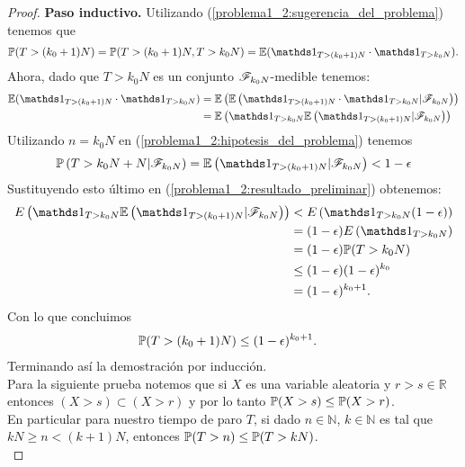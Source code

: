 \begin{proof}
	\textbf{Paso inductivo.} 
	Utilizando (\ref{problema1_2:sugerencia_del_problema}) tenemos que
		\begin{align}
			\mw(T>(k_0+1)N) = \mw(T>(k_0+1)N, T>k_0N) = \E(\indic_{T>(k_0+1)N} \cdot \indic_{T>k_0N}).
		\end{align}
	Ahora, dado que $T>k_0N$ es un conjunto $\mathscr{F}_{k_0N}$-medible tenemos:
	\begin{align} 
		\E(\indic_{T>(k_0+1)N} \cdot \indic_{T>k_0N}) 	&=		\E\left(\E\left(\indic_{T>(k_0+1)N} \cdot \indic_{T>k_0N} | \F_{k_0N}\right)\right) \\ 
														&=		\E\left(\indic_{T>k_0N} \E\left(\indic_{T>(k_0+1)N}|\F_{k_0N}\right)\right) \label{problema1_2:resultado_preliminar}
	\end{align}
	Utilizando  $n=k_0N$ en (\ref{problema1_2:hipotesis_del_problema}) tenemos
	\begin{align}
		\mw\left(T>k_0N+N|\F_{k_0N}\right) = \E\left(\indic_{T>(k_0+1)N}|\F_{k_0N}\right) < 1-\epsilon
	\end{align}
	Sustituyendo esto último en (\ref{problema1_2:resultado_preliminar}) obtenemos:
		\begin{align}
				 E\left(\indic_{T>k_0N} \E\left(\indic_{T>(k_0+1)N}|\F_{k_0N}\right)\right) 	&< 		E\left(\indic_{T>k_0N} (1-\epsilon)\right) \\
																								&=	 	(1-\epsilon) E\left(\indic_{T>k_0N} \right) \\
																								&=		(1-\epsilon) \mw(T>k_0N) \\
																								&\leq   (1-\epsilon)(1-\epsilon)^{k_0} \\
																								&= (1-\epsilon)^{k_0 + 1}.
		\end{align}
	Con lo que concluimos
		\begin{align}
			\mathbb{P}(T>(k_0+1)N) &\leq (1-\epsilon)^{k_0 + 1}.		
		\end{align}
	Terminando así la demostración por inducción.\\
	
	
	Para la siguiente prueba notemos que si $X$ es una variable aleatoria y $r > s \in \mathbb{R}$ entonces
	$(X > s) \subset (X > r)$ y por lo tanto $\mathbb{P}(X > s) \leq \mathbb{P}(X > r)$.\\
	
	En particular para nuestro tiempo de paro $T$, si dado $n \in \mathbb{N}$, $k \in \mathbb{N}$ es tal que 
	$kN \geq n < (k+1)N$, entonces $\mathbb{P}(T > n) \leq \mathbb{P}(T > kN)$.\\	


\end{proof}
